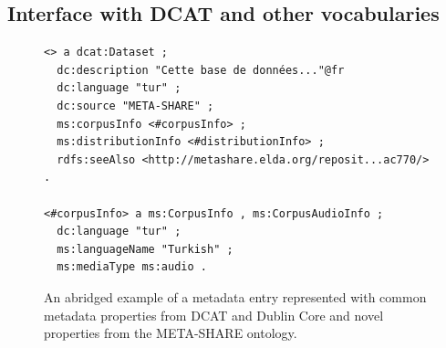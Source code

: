 \documentclass{llncs}
\begin{document}
\subsection{Interface with DCAT and other vocabularies}

\begin{figure}
    {\footnotesize
    \begin{verbatim}
<> a dcat:Dataset ;
  dc:description "Cette base de données..."@fr
  dc:language "tur" ;
  dc:source "META-SHARE" ;
  ms:corpusInfo <#corpusInfo> ;
  ms:distributionInfo <#distributionInfo> ;
  rdfs:seeAlso <http://metashare.elda.org/reposit...ac770/> .

<#corpusInfo> a ms:CorpusInfo , ms:CorpusAudioInfo ;
  dc:language "tur" ;
  ms:languageName "Turkish" ;
  ms:mediaType ms:audio .

\end{verbatim}}
\caption{An abridged example of a metadata entry represented with common metadata
    properties from DCAT and Dublin Core and novel properties from the META-SHARE
ontology.\label{fig:example-dcat}}
\end{figure}
\end{document}
